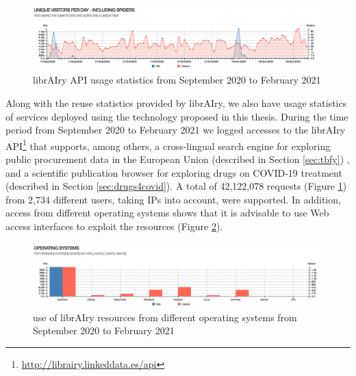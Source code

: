 \begin{figure}[ht]
    \centering
    \includegraphics[width=\linewidth]{usage-statistics.png}
    \caption{librAIry API usage statistics from September 2020 to February 2021}
    \label{fig:api-usage}
\end{figure}


Along with the reuse statistics provided by librAIry, we also have usage statistics of services deployed using the technology proposed in this thesis. During the time period from September 2020 to February 2021 we logged accesses to the librAIry API\footnote{\url{http://librairy.linkeddata.es/api}} that supports, among others, a cross-lingual search engine for exploring public procurement data in the European Union (described in Section \ref{sec:tbfy}) , and a scientific publication browser for exploring drugs on COVID-19 treatment  (described in Section \ref{sec:drugs4covid}).  A total of 42,122,078 requests (Figure \ref{fig:api-usage}) from 2,734 different users, taking IPs into account, were supported. In addition, access from different operating systems shows that it is advisable to use Web access interfaces to exploit the resources (Figure \ref{fig:so-usage}).


\begin{figure}[ht]
    \centering
    \includegraphics[width=\linewidth]{so-statistics.png}
    \caption{use of librAIry resources from different operating systems from September 2020 to February 2021}
    \label{fig:so-usage}
\end{figure}


